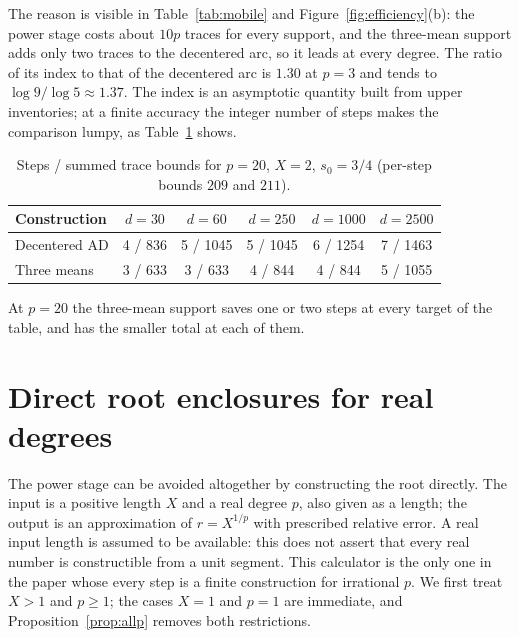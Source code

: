 The reason is visible in Table~\ref{tab:mobile} and Figure~\ref{fig:efficiency}(b): the power stage costs
about $10p$ traces for every support, and the three-mean support adds only two traces to the decentered
arc, so it leads at every degree. The ratio of its index to that of the decentered arc is $1.30$ at $p=3$
and tends to $\log9/\log5\approx1.37$. The index is an asymptotic quantity built from upper inventories;
at a finite accuracy the integer number of steps makes the comparison lumpy, as Table~\ref{tab:p20} shows.

\begin{table}[htbp]
\centering\small
\caption{Steps / summed trace bounds for $p=20$, $X=2$, $s_0=3/4$ (per-step bounds $209$ and
$211$).}\label{tab:p20}
\begin{tabular}{@{}lccccc@{}}
\toprule
Construction & $d=30$ & $d=60$ & $d=250$ & $d=1000$ & $d=2500$\\
\midrule
Decentered AD & 4 / 836 & 5 / 1045 & 5 / 1045 & 6 / 1254 & 7 / 1463\\
Three means & 3 / 633 & 3 / 633 & 4 / 844 & 4 / 844 & 5 / 1055\\
\bottomrule
\end{tabular}
\end{table}

At $p=20$ the three-mean support saves one or two steps at every target of the table, and has the
smaller total at each of them.

\section{Direct root enclosures for real degrees}\label{sec:enclosure}


The power stage can be avoided altogether by constructing the root directly. The input is a positive
length $X$ and a real degree $p$, also given as a length; the output is an approximation of
$r=X^{1/p}$ with prescribed relative error. A real input length is assumed to be available: this does
not assert that every real number is constructible from a unit segment. This calculator is the only one in
the paper whose every step is a finite construction for irrational $p$. We first treat $X>1$ and $p\ge1$;
the cases $X=1$ and $p=1$ are immediate, and Proposition~\ref{prop:allp} removes both restrictions.

